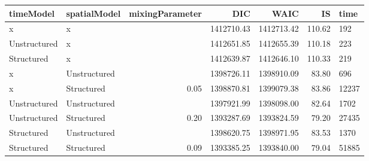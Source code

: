 \begin{table}[ht]
\centering
\begin{tabular}{llrrrrl}
  \hline
timeModel & spatialModel & mixingParameter & DIC & WAIC & IS & time \\ 
  \hline
x & x &  & 1412710.43 & 1412713.42 & 110.62 & 192 \\ 
  Unstructured & x &  & 1412651.85 & 1412655.39 & 110.18 & 223 \\ 
  Structured & x &  & 1412639.87 & 1412646.10 & 110.33 & 219 \\ 
  x & Unstructured &  & 1398726.11 & 1398910.09 & 83.80 & 696 \\ 
  x & Structured & 0.05 & 1398870.81 & 1399079.38 & 83.86 & 12237 \\ 
  Unstructured & Unstructured &  & 1397921.99 & 1398098.00 & 82.64 & 1702 \\ 
  Unstructured & Structured & 0.20 & 1393287.69 & 1393824.59 & 79.20 & 27435 \\ 
  Structured & Unstructured &  & 1398620.75 & 1398971.95 & 83.53 & 1370 \\ 
  Structured & Structured & 0.09 & 1393385.25 & 1393840.00 & 79.04 & 51885 \\ 
   \hline
\end{tabular}
\end{table}
